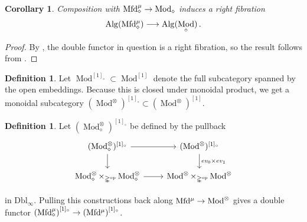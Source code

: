 \documentclass[10pt]{amsart}
\numberwithin{equation}{section}
\newtheorem{cor}[prop]{Corollary}
\theoremstyle{definition}
\newtheorem{definition}[prop]{Definition}
\DeclareMathOperator{\Mod}{Mod}
\DeclareMathOperator{\op}{op}
\newcommand{\Mfd}{\mathrm{Mfd}\vphantom{d}}
\newcommand{\Alg}{\mathrm{Alg}\vphantom{z}}
\newcommand{\Simp}{\mathbb{\Delta}}
\newcommand{\Dbl}{\mathrm{Dbl}}
\renewcommand{\to}{\mathchoice{\longrightarrow}{\rightarrow}{}{}}
\begin{document}
\begin{cor}\label{cor:Alg(Mfd)->Alg(Mod)_is_right_fib}
	Composition with $\Mfd_{\diamond}^{\mu} \to \Mod_{\diamond}$ induces a right fibration
	\begin{align*}
		\Alg(\Mfd_{\diamond}^{\mu}) \to \Alg(\Mod_{\diamond}) \,.
	\end{align*}
\end{cor}

\begin{proof}
	By , the double functor in question is a right fibration, so the result follows from .
\end{proof}

\begin{definition}
	Let $\Mod^{[1]_{\circ}} \subset \Mod^{[1]}$ denote the full subcategory spanned by the open embeddings.
	Because this is closed under monoidal product, we get a monoidal subcategory $(\Mod^{\otimes})^{[1]_{\circ}} \subset (\Mod^{\otimes})^{[1]}$.
\end{definition}

\begin{definition}
	Let $(\Mod_{\diamond}^{\otimes})^{[1]_{\circ}}$ be defined by the pullback
	\begin{equation*}
		\begin{tikzcd}
			(\Mod^{\otimes}_{\diamond})^{[1]_{\circ}} \arrow[r] \arrow[d]      &   (\Mod^{\otimes})^{[1]_{\circ}}  \arrow[d, "ev_{0}\times ev_{1}"] \\
			\Mod^{\otimes}_{\diamond} \times_{\Simp^{\op}} \Mod^{\otimes}_{\diamond}  \arrow[r]               &   \Mod^{\otimes}\times_{\Simp^{\op}} \Mod^{\otimes}
		\end{tikzcd}
	\end{equation*}
\end{definition}
in $\Dbl_{\infty}$.
Pulling this constructions back along $\Mfd^{\mu}\to \Mod^{\otimes}$ gives a double functor $\left(\Mfd_{\diamond}^{\mu} \right)^{[1]_{\circ}} \to \left(\Mfd^{\mu}\right)^{[1]_{\circ}}$.
\end{document}
